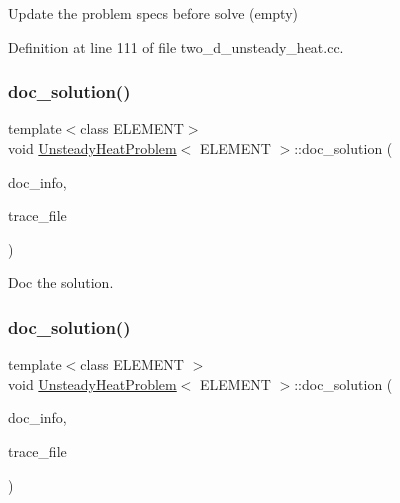 Update the problem specs before solve (empty) 



Definition at line 111 of file two\+\_\+d\+\_\+unsteady\+\_\+heat.\+cc.

\mbox{\label{classUnsteadyHeatProblem_a2c0c4b762d2dbde7396dca2a6750f433}} 
\subsubsection{\texorpdfstring{doc\+\_\+solution()}{doc\_solution()}\hspace{0.1cm}{\footnotesize\ttfamily [1/2]}}
{\footnotesize\ttfamily template$<$class E\+L\+E\+M\+E\+NT$>$ \\
void \hyperlink{classUnsteadyHeatProblem}{Unsteady\+Heat\+Problem}$<$ E\+L\+E\+M\+E\+NT $>$\+::doc\+\_\+solution (\begin{DoxyParamCaption}\item[{Doc\+Info \&}]{doc\+\_\+info,  }\item[{ofstream \&}]{trace\+\_\+file }\end{DoxyParamCaption})}



Doc the solution. 

\mbox{\label{classUnsteadyHeatProblem_a2c0c4b762d2dbde7396dca2a6750f433}} 
\subsubsection{\texorpdfstring{doc\+\_\+solution()}{doc\_solution()}\hspace{0.1cm}{\footnotesize\ttfamily [2/2]}}
{\footnotesize\ttfamily template$<$class E\+L\+E\+M\+E\+NT $>$ \\
void \hyperlink{classUnsteadyHeatProblem}{Unsteady\+Heat\+Problem}$<$ E\+L\+E\+M\+E\+NT $>$\+::doc\+\_\+solution (\begin{DoxyParamCaption}\item[{Doc\+Info \&}]{doc\+\_\+info,  }\item[{ofstream \&}]{trace\+\_\+file }\end{DoxyParamCaption})}



